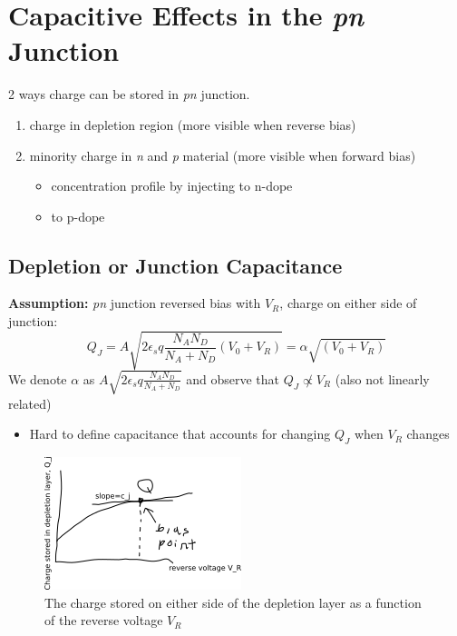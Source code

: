 \documentclass{report}
\begin{document}
\section{Capacitive Effects in the \textit{pn} Junction}

2 ways charge can be stored in \textit{pn} junction.
\begin{enumerate}
	\item charge in depletion region (more visible when reverse bias)
	\item minority charge in \textit{n} and \textit{p} material (more visible when forward bias)
	\begin{itemize}
		\item concentration profile by injecting to n-dope
		\item {}\phantom{concentration profile by injecting} to p-dope
	\end{itemize}
\end{enumerate}

\subsection{Depletion or Junction Capacitance}\label{sec:3.6.1-depletion-or...}

\textbf{Assumption:} \textit{pn} junction reversed bias with $V_R$, charge on either side of junction:
\begin{equation}
	Q_J = A \sqrt{2\epsilon_s q \frac{N_A N_D}{N_A + N_D} \left(V_0 + V_R\right)} = \alpha \sqrt{\left(V_0 + V_R\right)}
	\label{eq:3.6-alpha-v0-vr}
\end{equation}
We denote $\alpha$ as $A \sqrt{2\epsilon_s q \frac{N_A N_D}{N_A + N_D}}$ and observe that $Q_J \not\propto V_R$ (also not linearly related)
\begin{itemize}
	\item Hard to define capacitance that accounts for changing $Q_J$ when $V_R$ changes
\end{itemize}

\begin{figure}[!hbpt]
	\centering
	\includegraphics{path172092.png}
	\caption{The charge stored on either side of the depletion layer as a function of the reverse voltage $V_R$}
	\label{fig:charge-volt-cap-graph}
\end{figure}
\end{document}
